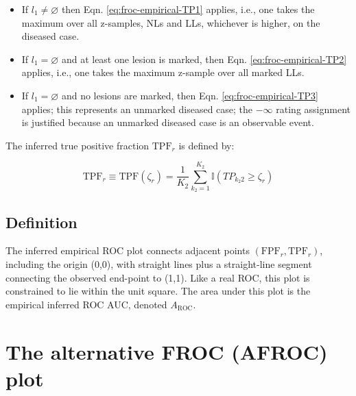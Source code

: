 \documentclass[
]{book}
\begin{document}
\begin{itemize}
\item
  If \(l_1 \neq \varnothing\) then Eqn. \eqref{eq:froc-empirical-TP1} applies, i.e., one takes the maximum over all z-samples, NLs and LLs, whichever is higher, on the diseased case.
\item
  If \(l_1 = \varnothing\) and at least one lesion is marked, then Eqn. \eqref{eq:froc-empirical-TP2} applies, i.e., one takes the maximum z-sample over all marked LLs.
\item
  If \(l_1 = \varnothing\) and no lesions are marked, then Eqn. \eqref{eq:froc-empirical-TP3} applies; this represents an unmarked diseased case; the \(-\infty\) rating assignment is justified because an unmarked diseased case is an observable event.
\end{itemize}

The inferred true positive fraction \(\text{TPF}_r\) is defined by:

\begin{equation}
\text{TPF}_r \equiv \text{TPF}(\zeta_r) = \frac{1}{K_2}\sum_{k_2=1}^{K_2} \mathbb{I}\left ( TP_{k_2 2} \geq \zeta_r \right )
\label{eq:froc-empirical-TPF}
\end{equation}

\hypertarget{froc-empirical-definition-auc-ROC}{%
\subsection{Definition}\label{froc-empirical-definition-auc-ROC}}

The inferred empirical ROC plot connects adjacent points \(\left( \text{FPF}_r, \text{TPF}_r \right )\), including the origin (0,0), with straight lines plus a straight-line segment connecting the observed end-point to (1,1). Like a real ROC, this plot is constrained to lie within the unit square. The area under this plot is the empirical inferred ROC AUC, denoted \(A_{\text{ROC}}\).

\hypertarget{froc-empirical-AFROC}{%
\section{The alternative FROC (AFROC) plot}\label{froc-empirical-AFROC}}
\end{document}
